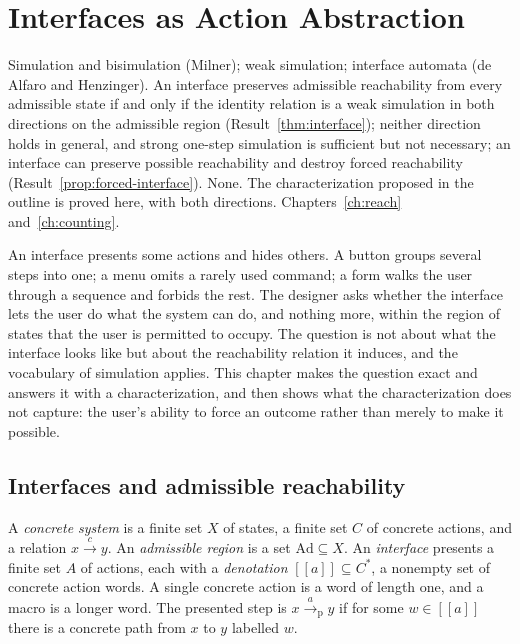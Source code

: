 \chapter{Interfaces as Action Abstraction}\label{ch:interfaces}
{Simulation and bisimulation (Milner); weak simulation; interface automata (de Alfaro and Henzinger).}
{An interface preserves admissible reachability from every admissible state if and only if the identity relation is a weak simulation in both directions on the admissible region (Result~\ref{thm:interface}); neither direction holds in general, and strong one-step simulation is sufficient but not necessary; an interface can preserve possible reachability and destroy forced reachability (Result~\ref{prop:forced-interface}).}
{None. The characterization proposed in the outline is proved here, with both directions.}
{Chapters~\ref{ch:reach} and~\ref{ch:counting}.}

An interface presents some actions and hides others. A button groups several steps into one; a menu omits a rarely used command; a form walks the user through a sequence and forbids the rest. The designer asks whether the interface lets the user do what the system can do, and nothing more, within the region of states that the user is permitted to occupy. The question is not about what the interface looks like but about the reachability relation it induces, and the vocabulary of simulation applies. This chapter makes the question exact and answers it with a characterization, and then shows what the characterization does not capture: the user's ability to force an outcome rather than merely to make it possible.

\section{Interfaces and admissible reachability}

\begin{definition}\label{def:interface}
A \emph{concrete system} is a finite set $X$ of states, a finite set $C$ of concrete actions, and a relation $x\xrightarrow{c}y$. An \emph{admissible region} is a set $\mathrm{Ad}\subseteq X$. An \emph{interface} presents a finite set $A$ of actions, each with a \emph{denotation} $[\![a]\!]\subseteq C^{*}$, a nonempty set of concrete action words. A single concrete action is a word of length one, and a macro is a longer word. The presented step is $x\xrightarrow{a}_{\mathrm p}y$ if for some $w\in[\![a]\!]$ there is a concrete path from $x$ to $y$ labelled $w$.
\end{definition}

